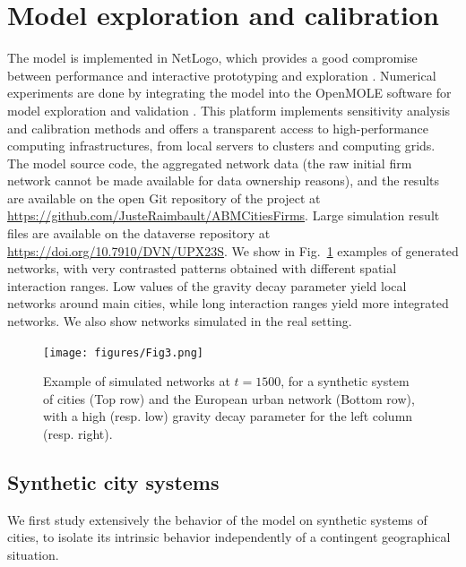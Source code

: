 \documentclass[10pt,letterpaper]{article}
\begin{document}
\section*{Model exploration and calibration}

The model is implemented in NetLogo, which provides a good compromise between performance and interactive prototyping and exploration \cite{railsback2017improving}. Numerical experiments are done by integrating the model into the OpenMOLE software for model exploration and validation \cite{reuillon2013openmole}. This platform implements sensitivity analysis and calibration methods and offers a transparent access to high-performance computing infrastructures, from local servers to clusters and computing grids. The model source code, the aggregated network data (the raw initial firm network cannot be made available for data ownership reasons), and the results are available on the open Git repository of the project at \url{https://github.com/JusteRaimbault/ABMCitiesFirms}. Large simulation result files are available on the dataverse repository at \url{https://doi.org/10.7910/DVN/UPX23S}. We show in Fig.~\ref{fig:fig3} examples of generated networks, with very contrasted patterns obtained with different spatial interaction ranges. Low values of the gravity decay parameter yield local networks around main cities, while long interaction ranges yield more integrated networks. We also show networks simulated in the real setting.

\begin{figure}
    \begin{center}
        \texttt{[image: figures/Fig3.png]}
    \end{center}
    \vspace{2cm}
    \caption{Example of simulated networks at $t=1500$, for a synthetic system of cities (Top row) and the European urban network (Bottom row), with a high (resp. low) gravity decay parameter for the left column (resp. right).\label{fig:fig3}}
\end{figure}


\subsection*{Synthetic city systems}

We first study extensively the behavior of the model on synthetic systems of cities, to isolate its intrinsic behavior independently of a contingent geographical situation.
\end{document}
